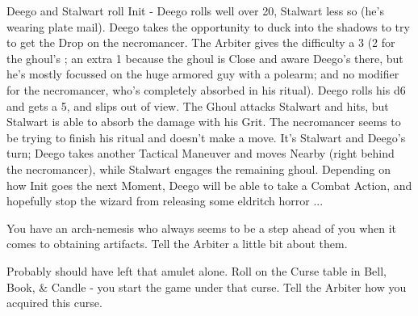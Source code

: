 {{    Deego and Stalwart roll Init - Deego rolls well over 20, Stalwart less so (he's wearing plate mail).  Deego takes the opportunity to duck into the shadows to try to get the Drop on the necromancer. The Arbiter gives the difficulty a 3 (2 for the ghoul's \HD; an extra 1 because the ghoul is Close and aware Deego's there, but he's mostly focussed on the huge armored guy with a polearm; and no modifier for the necromancer, who's completely absorbed in his ritual). Deego rolls his d6 and gets a 5, and slips out of view.  The Ghoul attacks Stalwart and hits, but Stalwart is able to absorb the damage with his Grit.  The necromancer seems to be trying to finish his ritual and doesn't make a move.  It's Stalwart and Deego's turn; Deego takes another Tactical Maneuver and moves Nearby (right behind the necromancer), while Stalwart engages the remaining ghoul.  Depending on how Init goes the next Moment, Deego will be able to take a Combat Action, and hopefully stop the wizard from releasing some eldritch horror ...
  }

 \cbreak



    
    You have an arch-nemesis who always seems to be a step ahead of you when it comes to obtaining artifacts. Tell the Arbiter a little bit about them.


    Probably should have left that amulet alone.  Roll on the Curse table in Bell, Book, \& Candle - you start the game under that curse.  Tell the Arbiter how you acquired this curse.


}
